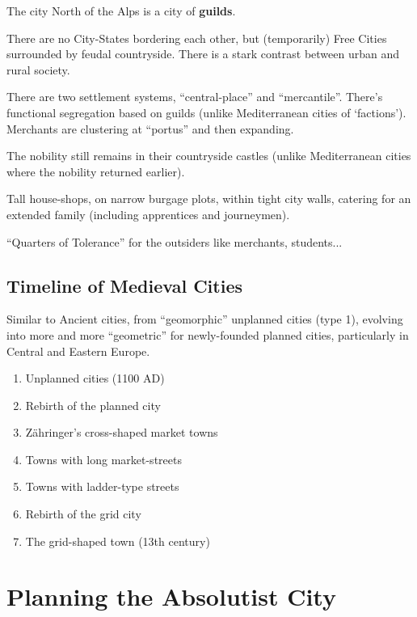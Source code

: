 \documentclass{article}
\begin{document}
The city North of the Alps is a city of \textbf{guilds}. 

There are no City-States bordering each other, but (temporarily) Free Cities surrounded by feudal countryside. There is a stark contrast between urban and rural society.

There are two settlement systems, ``central-place'' and ``mercantile''. There's functional segregation based on guilds (unlike Mediterranean cities of `factions').
Merchants are clustering at ``portus'' and then expanding.

The nobility still remains in their countryside castles (unlike Mediterranean cities where the nobility returned earlier). 

Tall house-shops, on narrow burgage plots, within tight city walls, catering for an extended family (including apprentices and journeymen).

``Quarters of Tolerance'' for the outsiders like merchants, students...

\subsection{Timeline of Medieval Cities}

Similar to Ancient cities, from ``geomorphic'' unplanned cities (type 1), evolving into more and more ``geometric'' for newly-founded planned cities, particularly in Central and Eastern Europe.

\begin{enumerate}
	\item Unplanned cities (1100 AD)
	\item Rebirth of the planned city
	\item Zähringer's cross-shaped market towns
	\item Towns with long market-streets
	\item Towns with ladder-type streets
	\item Rebirth of the grid city
	\item The grid-shaped town (13th century)
\end{enumerate}

\section{Planning the Absolutist City}

\subsection{}
\end{document}
